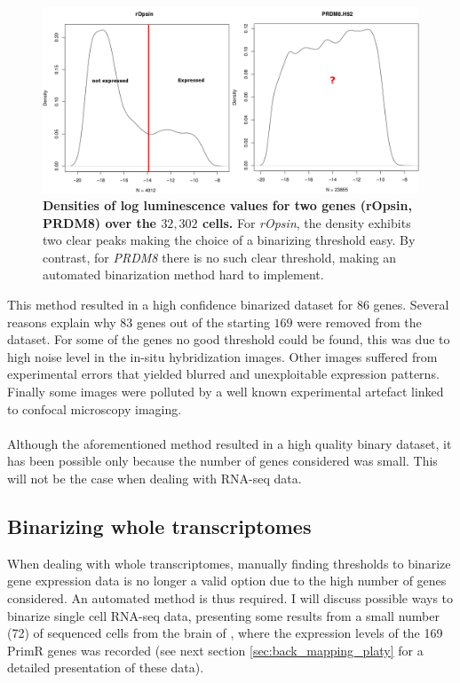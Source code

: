 	\begin{figure}[h]
\centerline{\includegraphics[width=\linewidth]{gfx/chapter2/densities_bina.png}}
\caption{{\bf Densities of log luminescence values for two genes (rOpsin, PRDM8) over the $32,302$ cells.} For {\it{rOpsin}}, the density exhibits two clear peaks making the choice of a binarizing threshold easy. By contrast, for {\it{PRDM8}} there is no such clear threshold, making an automated binarization method hard to implement.}\label{fig:densities_bina}
	\end{figure}
	
	This method resulted in a high confidence binarized dataset for $86$ genes. Several reasons explain why $83$ genes out of the starting $169$ were removed from the dataset. For some of the genes no good threshold could be found, this was due to high noise level in the in-situ hybridization images. Other images suffered from experimental errors that yielded blurred and unexploitable expression patterns. Finally some images were polluted by a well known experimental artefact linked to confocal microscopy imaging.\\
	
	\\
	
	Although the aforementioned method resulted in a high quality binary dataset, it has been possible only because the number of genes considered was small. This will not be the case when dealing with RNA-seq data.

  \subsection{Binarizing whole transcriptomes}
  
  When dealing with whole transcriptomes, manually finding thresholds to binarize gene expression data is no longer a valid option due to the high number of genes considered. An automated method is thus required. I will discuss possible ways to binarize single cell RNA-seq data, presenting some results from a small number (72) of sequenced cells from the brain of \platy{}, where the expression levels of the 169 PrimR genes was recorded (see next section \ref{sec:back_mapping_platy} for a detailed presentation of these data).\\
  
